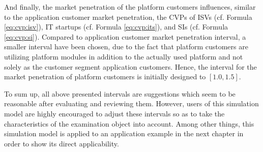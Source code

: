 And finally, the market penetration of the platform customers influences, similar to the application customer market penetration, the \acp{CVP} of \acp{ISV} (cf. Formula \ref{eq:cvp:isv}), \ac{IT} startups (cf. Formula \ref{eq:cvp:its}), and \acp{SI} (cf. Formula \ref{eq:cvp:si}). Compared to application customer market penetration interval, a smaller interval have been chosen, due to the fact that platform customers are utilizing platform modules in addition to the actually used platform and not solely as the customer segment application customers. Hence, the interval for the market penetration of platform customers is initially designed to $[1.0,1.5]$.

To sum up, all above presented intervals are suggestions which seem to be reasonable after evaluating and reviewing them. However, users of this simulation model are highly encouraged to adjust these intervals so as to take the characteristics of the examination object into account. Among other things, this simulation model is applied to an application example in the next chapter in order to show its direct applicability.

